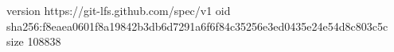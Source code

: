 version https://git-lfs.github.com/spec/v1
oid sha256:f8eaea0601f8a19842b3db6d7291a6f6f84c35256e3ed0435e24e54d8c803c5c
size 108838
